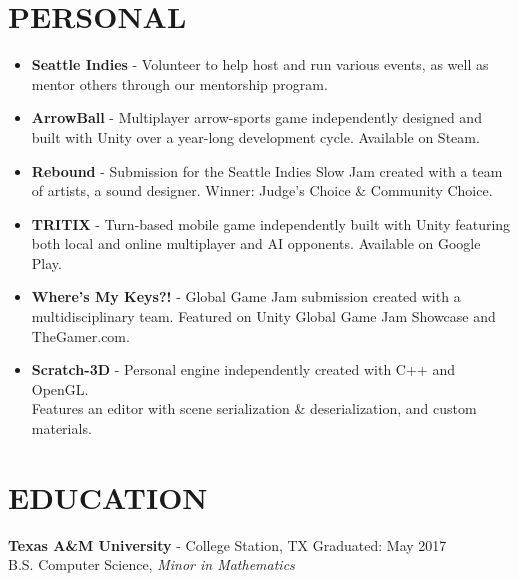 \documentclass[resmargin,10pt]{res} %
\begin{document}
\begin{resume}
\section{PERSONAL}
				\begin{itemize}
				\item \textbf{Seattle Indies} - Volunteer to help host and run various events, as well as mentor others through our mentorship program.
								\item \textbf{ArrowBall} - Multiplayer arrow-sports game independently designed and built with Unity over a year-long development cycle. Available on Steam.
								\item \textbf{Rebound} - Submission for the Seattle Indies Slow Jam created with a team of artists, a sound designer. Winner: Judge's Choice \& Community Choice.   
				                	\item \textbf{TRITIX} - Turn-based mobile game independently built with Unity featuring both local and online multiplayer and AI opponents. Available on Google Play.
				\item \textbf{Where's My Keys?!} - Global Game Jam submission created with a multidisciplinary team. Featured on Unity Global Game Jam Showcase and TheGamer.com.
				                	\item \textbf{Scratch-3D} - Personal engine independently created with C++ and OpenGL. \\Features an editor with scene serialization \& deserialization, and custom materials.
                \end{itemize}
                
\section{EDUCATION}
{\bf Texas A\&M University} - College Station, TX \hfill
Graduated: May 2017 \\
B.S. Computer Science,
\textit{Minor in Mathematics}
\end{resume} 
\end{document}
